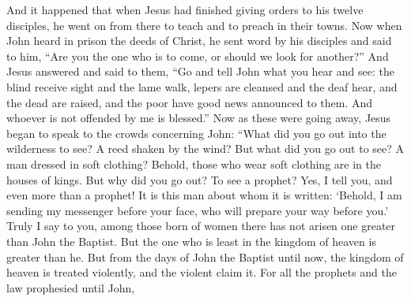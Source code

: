 \begin{biblechapter} %
 And it happened that when Jesus had finished giving orders to his twelve disciples, he went on from there to teach and to preach in their towns.
\verse Now when John heard in prison the deeds of Christ, he sent word by his disciples
\verse and said to him, “Are you the one who is to come, or should we look for another?”
\verse And Jesus answered and said to them, “Go and tell John what you hear and see:
\verse the blind receive sight and the lame walk, lepers are cleansed and the deaf hear, and the dead are raised, and the poor have good news announced to them.
\verse And whoever is not offended by me is blessed.”
\verse Now as these were going away, Jesus began to speak to the crowds concerning John: “What did you go out into the wilderness to see? A reed shaken by the wind?
\verse But what did you go out to see? A man dressed in soft clothing? Behold, those who wear soft clothing are in the houses of kings.
\verse But why did you go out? To see a prophet? Yes, I tell you, and even more than a prophet!
\verse It is this man about whom it is written: ‘Behold, I am sending my messenger before your face, 
who will prepare your way before you.’
\verse Truly I say to you, among those born of women there has not arisen one greater than John the Baptist. But the one who is least in the kingdom of heaven is greater than he.
\verse But from the days of John the Baptist until now, the kingdom of heaven is treated violently, and the violent claim it.
\verse For all the prophets and the law prophesied until John,

\end{biblechapter}
